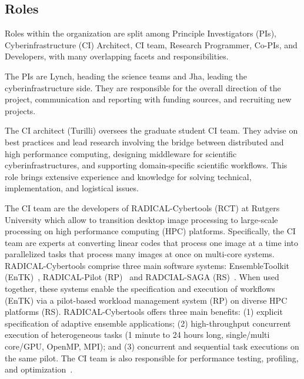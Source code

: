 \documentclass[manuscript,screen]{acmart}
\begin{document}
\subsection{Roles}
Roles within the organization are split among Principle Investigators (PIs), Cyberinfrastructure (CI) Architect, CI team, Research Programmer, Co-PIs, and Developers, with many overlapping facets and responsibilities.  

The PIs are Lynch, heading the science teams and Jha, leading the cyberinfrastructure side.  They are responsible for the overall direction of the project, communication and reporting with funding sources, and recruiting new projects.

The CI architect (Turilli) oversees the graduate student CI team.  They 
advise on best practices and lead research involving the bridge between 
distributed and high performance computing, designing middleware for 
scientific cyberinfrastructures, and supporting domain-specific scientific 
workflows.  This role brings extensive experience and knowledge for solving 
technical, implementation, and logistical issues.

The CI team are the developers of RADICAL-Cybertools (RCT) \cite{turilli2019middleware} \cite{RCTweb:20} at Rutgers University which allow to transition desktop image processing to large-scale processing on high performance computing (HPC) platforms. Specifically, the CI team are experts at converting linear codes that process one image at a time into parallelized tasks that process many images at once on multi-core systems.  RADICAL-Cybertools comprise three main software systems: EnsembleToolkit (EnTK)~\cite{balasubramanian2018harnessing}, RADICAL-Pilot (RP)~\cite{RP:18} and RADCIAL-SAGA (RS)~\cite{merzky2015saga}. When used together, these systems enable the specification and execution of workflows (EnTK) via a pilot-based workload management system (RP) on diverse HPC platforms (RS). RADICAL-Cybertools offers three main benefits: (1) explicit specification of adaptive ensemble applications; (2) high-throughput concurrent execution of heterogeneous tasks (1 minute to 24 hours long, single/multi core/GPU, OpenMP, MPI); and (3) concurrent and sequential task executions on the same pilot.
The CI team is also responsible for performance testing, profiling, and optimization~\cite{CI:20}. 
\end{document}
